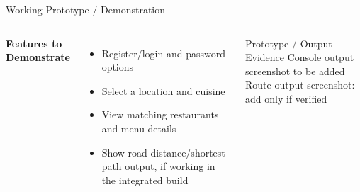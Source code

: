 \documentclass[aspectratio=169,10pt]{beamer}
\begin{document}
\begin{frame}{Working Prototype / Demonstration}
\begin{columns}[T,totalwidth=\textwidth]
\textbf{\color{GEUBlue}Features to Demonstrate}
\begin{itemize}\itemsep4pt
\item Register/login and password options
\item Select a location and cuisine
\item View matching restaurants and menu details
\item Show road-distance/shortest-path output, if working in the integrated build
\end{itemize}
\begin{block}{Prototype / Output Evidence}
\centering
\vspace{5mm}
Console output screenshot to be added\\[4mm]
Route output screenshot: add only if verified
\vspace{5mm}
\end{block}
\end{columns}

\end{frame}
\end{document}
